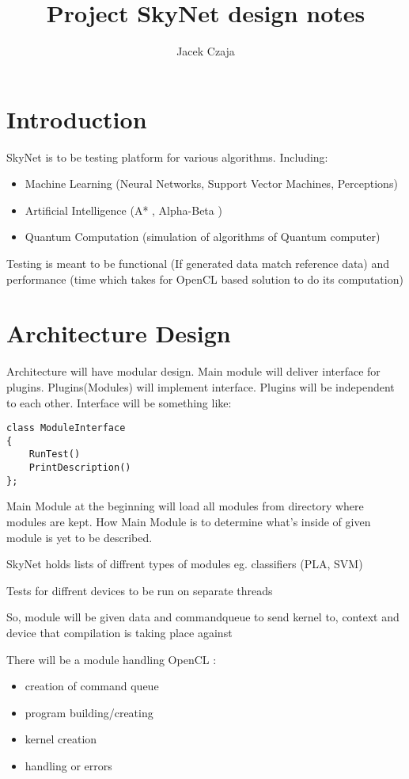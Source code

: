 \documentclass[a4paper,10pt]{article}
\title{Project SkyNet design notes}
\author{Jacek Czaja}
\begin{document}
\maketitle

\tableofcontents

\section{Introduction}
SkyNet is to be testing platform for various algorithms. Including:
\begin{itemize}
\item Machine Learning (Neural Networks, Support Vector Machines, Perceptions)
\item Artificial Intelligence (A* , Alpha-Beta )
\item Quantum Computation (simulation of algorithms of Quantum computer)
\end{itemize}

Testing is meant to be functional (If generated data match reference data) and performance (time which takes for OpenCL based solution to do its computation)

\section{Architecture Design}
Architecture will have modular design.
Main module will deliver interface for plugins.
Plugins(Modules) will implement interface.
Plugins will be independent to each other.
Interface will be something like:
\begin{verbatim}
class ModuleInterface
{
    RunTest()
    PrintDescription()
};
\end{verbatim}

Main Module at the beginning will load all modules from directory where modules are kept.
How Main Module is to determine what's inside of given module is  yet to be described.

SkyNet holds lists of diffrent types of modules eg. classifiers (PLA, SVM)

Tests for diffrent devices to be run on separate threads

So, module will be given data and commandqueue to send kernel to, context and device that compilation is taking place against

There will be a module handling OpenCL :
\begin{itemize}
\item creation of command queue
\item program building/creating
\item kernel creation
\item handling or errors
\end{itemize}
\end{document}
